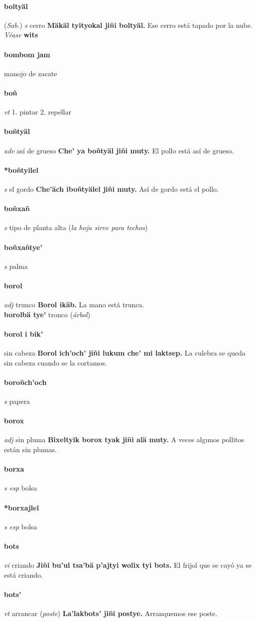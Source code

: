 \documentclass{scrbook}
\newcommand{\entry}[1]{\paragraph{#1}}
\newcommand{\onedefinition}[1]{#1.}
\newcommand{\partofspeech}[1]{\textit{#1}}
\newcommand{\spanishtranslation}[1]{#1}
\newcommand{\clarification}[1]{(\textit{#1})}
\newcommand{\cholexample}[1]{\textbf{#1}}
\newcommand{\exampletranslation}[1]{#1}
\newcommand{\alsosee}[1]{\\\textit{Véase} \textbf{#1}}
\newcommand{\relevantdialect}[1]{(\textit{#1})}
\newcommand{\secondaryentry}[1]{\\\textbf{#1}}
\newcommand{\secondtranslation}[1]{#1}
\begin{document}
\begin{multicols}{2}
\entry{boltyäl}
\relevantdialect{Sab.}
\partofspeech{s}
\spanishtranslation{cerro}
\cholexample{Mäkäl tyityokal jiñi boltyäl.}
\exampletranslation{Ese cerro está tapado por la nube.}
\alsosee{wits}

\entry{bombom jam}
\spanishtranslation{manojo de zacate}

\entry{boñ}
\partofspeech{vt}
\onedefinition{1}
\spanishtranslation{pintar}
\onedefinition{2}
\spanishtranslation{repellar}

\entry{boñtyäl}
\partofspeech{adv}
\spanishtranslation{así de grueso}
\cholexample{Che' ya boñtyäl jiñi muty.}
\exampletranslation{El pollo está así de grueso.}

\entry{*boñtyilel}
\partofspeech{s}
\spanishtranslation{el gordo}
\cholexample{Che'äch iboñtyälel jiñi muty.}
\exampletranslation{Así de gordo está el pollo.}

\entry{boñxañ}
\partofspeech{s}
\spanishtranslation{tipo de planta alta}
\clarification{la hoja sirve para techos}

\entry{boñxañtye'}
\partofspeech{s}
\spanishtranslation{palma}

\entry{borol}
\partofspeech{adj}
\spanishtranslation{trunco}
\cholexample{Borol ikäb.}
\exampletranslation{La mano está trunca.}
\secondaryentry{borolbä tye'}
\secondtranslation{tronco}
\clarification{árbol}

\entry{borol i bik'}
\spanishtranslation{sin cabeza}
\cholexample{Borol ich'och' jiñi lukum che' mi laktsep.}
\exampletranslation{La culebra se queda sin cabeza cuando se la cortamos.}

\entry{boroñch'och}
\partofspeech{s}
\spanishtranslation{papera}

\entry{borox}
\partofspeech{adj}
\spanishtranslation{sin pluma}
\cholexample{Bixeltyik borox tyak jiñi alä muty.}
\exampletranslation{A veces algunos pollitos están sin plumas.}

\entry{borxa}
\partofspeech{s esp}
\spanishtranslation{bolsa}

\entry{*borxajlel}
\partofspeech{s esp}
\spanishtranslation{bolsa}

\entry{bots}
\partofspeech{vi}
\spanishtranslation{criando}
\cholexample{Jiñi bu'ul tsa'bä p'ajtyi wolix tyi bots.}
\exampletranslation{El frijol que se cayó ya se está criando.}

\entry{bots'}
\partofspeech{vt}
\spanishtranslation{arrancar}
\clarification{poste}
\cholexample{La'lakbots' jiñi postye.}
\exampletranslation{Arranquemos ese poste.}


\end{multicols}
\end{document}
